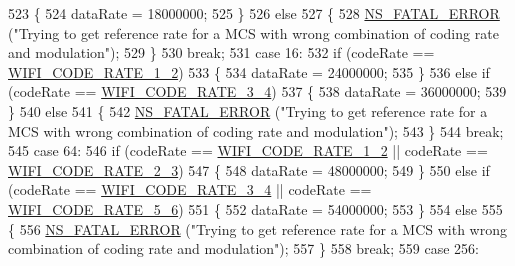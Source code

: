 \begin{DoxyCode}
523             \{
524               dataRate = 18000000;
525             \}
526           \textcolor{keywordflow}{else}
527             \{
528               \hyperlink{group__fatal_ga5131d5e3f75d7d4cbfd706ac456fdc85}{NS\_FATAL\_ERROR} (\textcolor{stringliteral}{"Trying to get reference rate for a MCS with wrong combination
       of coding rate and modulation"});
529             \}
530           \textcolor{keywordflow}{break};
531         \textcolor{keywordflow}{case} 16:
532           \textcolor{keywordflow}{if} (codeRate == \hyperlink{namespacens3_aeaf3a86fd4bdb7829955238fba43e2ada66dfa017f6a74bcb72cdccfee778e90b}{WIFI\_CODE\_RATE\_1\_2})
533             \{
534               dataRate = 24000000;
535             \}
536           \textcolor{keywordflow}{else} \textcolor{keywordflow}{if} (codeRate == \hyperlink{namespacens3_aeaf3a86fd4bdb7829955238fba43e2ada705b2eb134214c4f87c2b07dfb59046a}{WIFI\_CODE\_RATE\_3\_4})
537             \{
538               dataRate = 36000000;
539             \}
540           \textcolor{keywordflow}{else}
541             \{
542               \hyperlink{group__fatal_ga5131d5e3f75d7d4cbfd706ac456fdc85}{NS\_FATAL\_ERROR} (\textcolor{stringliteral}{"Trying to get reference rate for a MCS with wrong combination
       of coding rate and modulation"});
543             \}
544           \textcolor{keywordflow}{break};
545         \textcolor{keywordflow}{case} 64:
546           \textcolor{keywordflow}{if} (codeRate == \hyperlink{namespacens3_aeaf3a86fd4bdb7829955238fba43e2ada66dfa017f6a74bcb72cdccfee778e90b}{WIFI\_CODE\_RATE\_1\_2} || codeRate == 
      \hyperlink{namespacens3_aeaf3a86fd4bdb7829955238fba43e2ada161e88df840a9d1ed66f6f8edd0d6415}{WIFI\_CODE\_RATE\_2\_3})
547             \{
548               dataRate = 48000000;
549             \}
550           \textcolor{keywordflow}{else} \textcolor{keywordflow}{if} (codeRate == \hyperlink{namespacens3_aeaf3a86fd4bdb7829955238fba43e2ada705b2eb134214c4f87c2b07dfb59046a}{WIFI\_CODE\_RATE\_3\_4} || codeRate == 
      \hyperlink{namespacens3_aeaf3a86fd4bdb7829955238fba43e2adaf0309d61b4cf97e5718f6d3b9fdba3aa}{WIFI\_CODE\_RATE\_5\_6})
551             \{
552               dataRate = 54000000;
553             \}
554           \textcolor{keywordflow}{else}
555             \{
556               \hyperlink{group__fatal_ga5131d5e3f75d7d4cbfd706ac456fdc85}{NS\_FATAL\_ERROR} (\textcolor{stringliteral}{"Trying to get reference rate for a MCS with wrong combination
       of coding rate and modulation"});
557             \}
558           \textcolor{keywordflow}{break};
559         \textcolor{keywordflow}{case} 256:

\end{DoxyCode}
